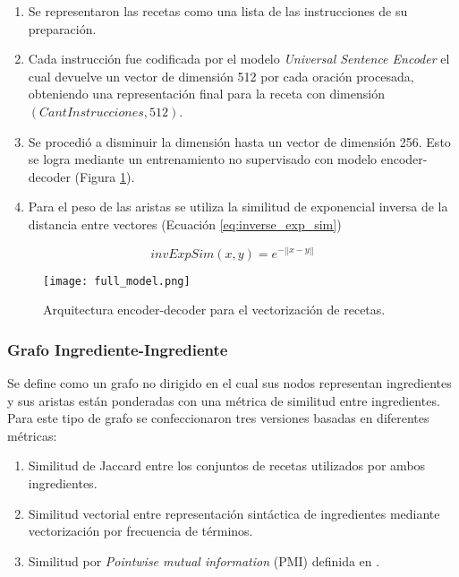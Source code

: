 \documentclass[
	a4paper, %
	10pt, %
	unnumberedsections, %
	twoside, %
]{LTJournalArticle}
\begin{document}
\begin{enumerate}
	\item Se representaron las recetas como una lista de las instrucciones de su preparación.
	\item Cada instrucción fue codificada por el modelo \textit{Universal Sentence Encoder} \autocite{Smith:2023qr}
	el cual devuelve un vector de dimensión 512 por cada oración procesada, obteniendo una representación final
	para la receta con dimensión $(CantInstrucciones, 512)$. 
	\item Se procedió a disminuir la dimensión hasta un vector de dimensión 256. Esto se logra mediante un 
	entrenamiento no supervisado con modelo encoder-decoder (Figura \ref{fig:encoder_decoder_small}).
	\item Para el peso de las aristas se utiliza la similitud de exponencial inversa de la distancia entre vectores 
	(Ecuación \ref{eq:inverse_exp_sim})
\end{enumerate}

\begin{equation}
	invExpSim(x, y) = e^{-||x-y||}
	\label{eq:inverse_exp_sim}
\end{equation}

\begin{figure}
	\texttt{[image: full\_model.png]}
	\caption{Arquitectura encoder-decoder para el vectorización de recetas.}
	\label{fig:encoder_decoder_small}
\end{figure}

\subsubsection{Grafo Ingrediente-Ingrediente}

Se define como un grafo no dirigido en el cual sus nodos representan ingredientes y sus aristas
están ponderadas con una métrica de similitud entre ingredientes. 
Para este tipo de grafo se confeccionaron tres versiones basadas en diferentes métricas:

\begin{enumerate}
	\item Similitud de Jaccard entre los conjuntos de recetas utilizados por ambos ingredientes.
	\item Similitud vectorial entre representación sintáctica de ingredientes mediante vectorización 
	por frecuencia de términos.
	\item Similitud por \textit{Pointwise mutual information} (PMI) definida en \textcite{teng2012recipe}.
\end{enumerate}
\end{document}
